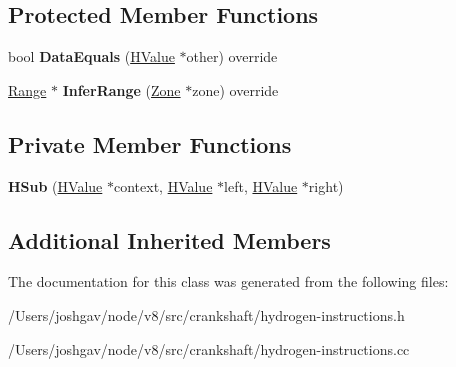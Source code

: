\subsection*{Protected Member Functions}
\begin{DoxyCompactItemize}
\item 
bool {\bfseries Data\+Equals} (\hyperlink{classv8_1_1internal_1_1_h_value}{H\+Value} $\ast$other) override\hypertarget{classv8_1_1internal_1_1_h_sub_a5e16d0b5c129ecffc59d76ff1abd8764}{}\label{classv8_1_1internal_1_1_h_sub_a5e16d0b5c129ecffc59d76ff1abd8764}

\item 
\hyperlink{classv8_1_1internal_1_1_range}{Range} $\ast$ {\bfseries Infer\+Range} (\hyperlink{classv8_1_1internal_1_1_zone}{Zone} $\ast$zone) override\hypertarget{classv8_1_1internal_1_1_h_sub_ae8cefbbb94782e9ebb6167e5794e95ae}{}\label{classv8_1_1internal_1_1_h_sub_ae8cefbbb94782e9ebb6167e5794e95ae}

\end{DoxyCompactItemize}
\subsection*{Private Member Functions}
\begin{DoxyCompactItemize}
\item 
{\bfseries H\+Sub} (\hyperlink{classv8_1_1internal_1_1_h_value}{H\+Value} $\ast$context, \hyperlink{classv8_1_1internal_1_1_h_value}{H\+Value} $\ast$left, \hyperlink{classv8_1_1internal_1_1_h_value}{H\+Value} $\ast$right)\hypertarget{classv8_1_1internal_1_1_h_sub_a7aedcb3b6411a7bc3abfa518b1dce473}{}\label{classv8_1_1internal_1_1_h_sub_a7aedcb3b6411a7bc3abfa518b1dce473}

\end{DoxyCompactItemize}
\subsection*{Additional Inherited Members}


The documentation for this class was generated from the following files\+:\begin{DoxyCompactItemize}
\item 
/\+Users/joshgav/node/v8/src/crankshaft/hydrogen-\/instructions.\+h\item 
/\+Users/joshgav/node/v8/src/crankshaft/hydrogen-\/instructions.\+cc\end{DoxyCompactItemize}
